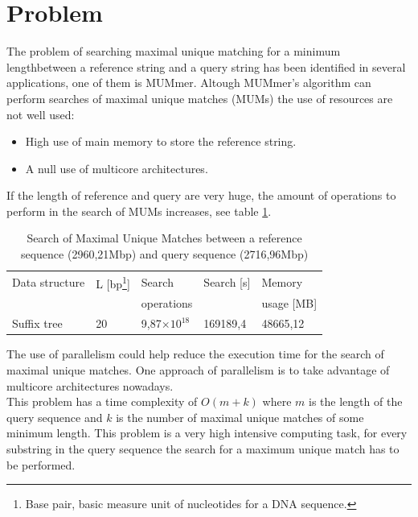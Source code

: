 \documentclass[3p,times]{elsarticle}
\providecommand{\e}[1]{\ensuremath{\times 10^{#1}}}
\begin{document}

\section{Problem}
\label{}
The problem of searching maximal unique matching for a minimum lengthbetween a reference
string and a query string has been
identified in several applications, one of them is MUMmer. Altough
MUMmer's algorithm can perform searches of maximal unique matches (MUMs)
the use of resources are not well used:
\begin{itemize}
  \item High use of main memory to store the reference string.
  \item A null use of multicore architectures.
\end{itemize}
If the length of reference and query are very huge, the amount of operations to perform
in the search of MUMs increases, see table \ref{tbl:operations}.
\begin{table}[ h!]
  \begin{small}
    \begin{center}
      \begin{tabular}{lllll}
        Data structure & L [bp\footnote{Base pair, basic measure unit of nucleotides for a DNA sequence.}] & Search  & Search [s] & Memory\\
        & & operations & & usage [MB]\\
        \hline
        Suffix tree & 20 & 9,87\e{18}  & 169189,4 & 48665,12\\
        \hline
      \end{tabular}
    \end{center}
  \end{small}
  \caption{Search of Maximal Unique Matches between a reference sequence (2960,21Mbp) and query sequence (2716,96Mbp)}
  \label{tbl:operations}
\end{table}
The use of parallelism could help reduce the execution time for the search of maximal unique matches. One approach of
parallelism is to take advantage of multicore architectures nowadays.\\
This problem has a time complexity of $O(m+k)$ where $m$ is the length of the query sequence and $k$ is the number of 
maximal unique matches of some minimum length. This problem is a very high intensive computing task, for every substring
in the query sequence the search for a maximum unique match has to be performed.\\ 
\end{document}
